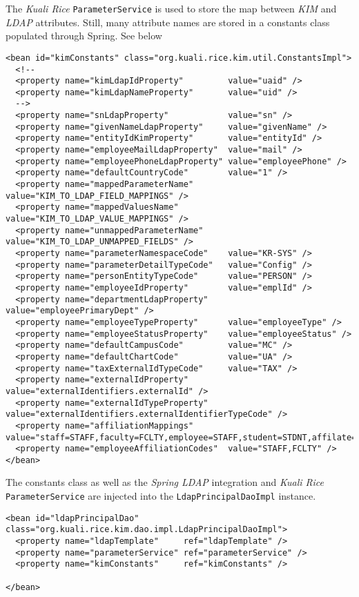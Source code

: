 \documentclass[12pt,notitlepage]{article}
\begin{document}
The \emph{Kuali Rice} \verb|ParameterService| is used to store the map between \emph{KIM} and \emph{LDAP} attributes. Still,
many attribute names are stored in a constants class populated through Spring. See below
\begin{lstlisting}
<bean id="kimConstants" class="org.kuali.rice.kim.util.ConstantsImpl">
  <!--
  <property name="kimLdapIdProperty"         value="uaid" />
  <property name="kimLdapNameProperty"       value="uid" />
  -->
  <property name="snLdapProperty"            value="sn" />
  <property name="givenNameLdapProperty"     value="givenName" />
  <property name="entityIdKimProperty"       value="entityId" />
  <property name="employeeMailLdapProperty"  value="mail" />
  <property name="employeePhoneLdapProperty" value="employeePhone" />
  <property name="defaultCountryCode"        value="1" />
  <property name="mappedParameterName"       value="KIM_TO_LDAP_FIELD_MAPPINGS" />
  <property name="mappedValuesName"          value="KIM_TO_LDAP_VALUE_MAPPINGS" />
  <property name="unmappedParameterName"     value="KIM_TO_LDAP_UNMAPPED_FIELDS" />
  <property name="parameterNamespaceCode"    value="KR-SYS" />
  <property name="parameterDetailTypeCode"   value="Config" />
  <property name="personEntityTypeCode"      value="PERSON" />
  <property name="employeeIdProperty"        value="emplId" />
  <property name="departmentLdapProperty"    value="employeePrimaryDept" />  
  <property name="employeeTypeProperty"      value="employeeType" />
  <property name="employeeStatusProperty"    value="employeeStatus" />
  <property name="defaultCampusCode"         value="MC" />
  <property name="defaultChartCode"          value="UA" />
  <property name="taxExternalIdTypeCode"     value="TAX" />
  <property name="externalIdProperty"        value="externalIdentifiers.externalId" />
  <property name="externalIdTypeProperty"    value="externalIdentifiers.externalIdentifierTypeCode" />
  <property name="affiliationMappings"       value="staff=STAFF,faculty=FCLTY,employee=STAFF,student=STDNT,affilate=AFLT"/>
  <property name="employeeAffiliationCodes"  value="STAFF,FCLTY" />
</bean>
\end{lstlisting}

The constants class as well as the \emph{Spring LDAP} integration and \emph{Kuali Rice} \verb|ParameterService| are 
injected into the \verb|LdapPrincipalDaoImpl| instance.
\begin{lstlisting}
<bean id="ldapPrincipalDao" class="org.kuali.rice.kim.dao.impl.LdapPrincipalDaoImpl">
  <property name="ldapTemplate"     ref="ldapTemplate" />
  <property name="parameterService" ref="parameterService" />
  <property name="kimConstants"     ref="kimConstants" />

</bean>\end{lstlisting}
\end{document}
